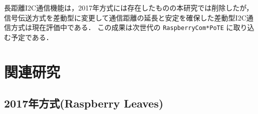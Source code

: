 長距離I2C通信機能は，2017年方式には存在したものの本研究では削除したが，信号伝送方式を差動型に変更して通信距離の延長と安定を確保した差動型I2C通信方式は現在評価中である．
この成果は次世代の {\tt Raspberry\-Com*PoTE} に取り込む予定である．





\section{関連研究}
\label{sec:03relatedworks}

\subsection{2017年方式(Raspberry Leaves)}

